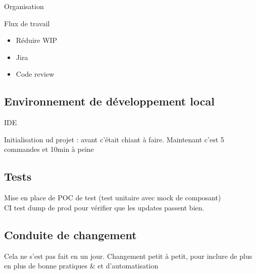 \begin{frame}{Organisation}
	\begin{block}{Flux de travail}
		\begin{itemize}
			\item Réduire WIP
			\item Jira
			\item Code review
		\end{itemize}
	\end{block}

\end{frame}

\subsection[Développement]{Environnement de développement local}
\begin{frame}{\subsecname}
	IDE
	
	Initialisation ud projet : avant c'était chiant à faire. Maintenant c'est 5 commandes et 10min à peine
\end{frame}

\subsection{Tests}
\begin{frame}{\subsecname}
	Mise en place de POC de test (test unitaire avec mock de composant) \\
	CI test dump de prod pour vérifier que les updates passent bien.
\end{frame}

\subsection{Conduite de changement}
\begin{frame}{\subsecname}
	Cela ne s'est pas fait en un jour. Changement petit à petit, pour inclure de plus en plus de bonne pratiques \& et d'automatisation
\end{frame}
